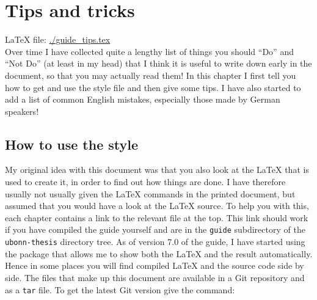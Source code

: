
\chapter{Tips and tricks}%
\label{sec:tips}

\LaTeX{} file: \url{./guide_tips.tex}\\[1ex]
\noindent
Over time I have collected quite a lengthy list of things you should
\enquote{Do} and \enquote{Not Do} (at least in my head) that I think
it is useful to write down early in the document, so that you may
actually read them!  In this chapter I first tell you how to get
and use the style file and then give some tips.
I have also started to add a list of common English mistakes,
especially those made by German speakers!

\section{How to use the  style}%
\label{sec:tips:howto}

My original idea with this document was that you also look at the \LaTeX{} that
is used to create it, in order to find out how things are done.
I have therefore usually not usually given the \LaTeX{} commands in the printed
document, but assumed that you would have a look at the \LaTeX{} source.
To help you with this, each chapter contains a link to the relevant
file at the top. This link should work if you have compiled the guide
yourself and are in the \texttt{guide} subdirectory of the
\texttt{ubonn-thesis} directory tree.
As of version 7.0 of the guide,
I have started using the  package that allows me to show
both the \LaTeX{} and the result automatically.
Hence in some places you will find compiled \LaTeX{} and the source code side by side.
The files that make up this document are available in a Git repository and as a \texttt{tar} file.
To get the latest Git version give the command:

